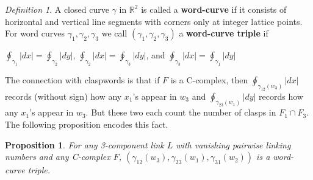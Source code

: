 \documentclass[11pt]{amsart}
\newtheorem{proposition}[theorem]{Proposition}
\theoremstyle{remark}
\newtheorem{definition}[theorem]{Definition}
\newcommand{\R}{\mathbb{R}}
\newcommand{\chris}[1]{\textcolor{purple}{[Chris] #1}}
\newcommand{\David}[1]{\textcolor{red}{[David] #1}}
\begin{document}
\begin{definition}\label{defn: word curve triple}
A closed curve $\gamma$ in $\R^2$ is called a \textbf{word-curve} if it consists of horizontal and vertical line segments with corners only at integer lattice points.  For word curves $\gamma_1, \gamma_2, \gamma_3$ we call $(\gamma_1, \gamma_2, \gamma_3)$ a \textbf{word-curve triple} if 
\begin{center}
$\displaystyle\oint_{\gamma_{1}}|dx| = \oint_{\gamma_{2}}|dy|$, $\displaystyle\oint_{\gamma_{2}}|dx|=\oint_{\gamma_3}|dy|$, and $\displaystyle\oint_{\gamma_{3}}|dx|=\oint_{\gamma_1}|dy|$
\end{center}
\end{definition}
The connection with claspwords is that if $F$ is a C-complex, then $\displaystyle\oint_{\gamma_{12}(w_3)}|dx|$ records (without sign) how any $x_1$'s appear in $w_3$ and $\displaystyle\oint_{\gamma_{23}(w_1)}|dy|$ records how any $x_1$'s appear in $w_3$.  But these two each count the number of clasps in $F_1\cap F_3$. The following proposition encodes this fact.

\begin{proposition}
For any 3-component link $L$ with vanishing pairwise linking numbers and any C-complex $F$, $(\gamma_{12}(w_3), \gamma_{23}(w_1), \gamma_{31}(w_2))$ is a word-curve triple. 
\end{proposition}


\end{document}
